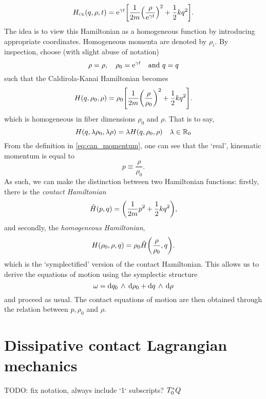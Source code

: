 \begin{equation}
    H_\text{\tiny{\textsc{CK}}}(q, \rho, t) = \mathrm{e}^{\gamma t}\qty[\frac{1}{2m}\qty(\frac{\rho}{\mathrm{e}^{\gamma t}})^2 + \frac{1}{2}kq^2].
\end{equation}
The idea is to view this Hamiltonian as a homogeneous function by introducing appropriate coordinates. Homogeneous momenta are denoted by $\rho_i$. By inspection, choose (with slight abuse of notation)
$$ \rho = \rho,\quad \rho_0 = \mathrm{e}^{\gamma t}\quad \text{and } q = q$$
such that the Caldirola-Kanai Hamiltonian becomes
\begin{equation}
    H(q, \rho_0, \rho) = \rho_0\qty[\frac{1}{2m}\qty(\frac{\rho}{\rho_0})^2 + \frac{1}{2}kq^2].
\end{equation}
which is homogeneous in fiber dimensions $\rho_0$ and $\rho$. That is to say,
$$ H(q, \lambda \rho_0, \lambda \rho) = \lambda H(q, \rho_0, \rho) \quad \lambda \in \mathbb{R}_0$$
From the definition in \cref{eq:can_momentum}, one can see that the `real', kinematic momentum is equal to
$$ p \equiv \frac{\rho}{\rho_0}. $$
As such, we can make the distinction between two Hamiltonian functions: firstly, there is the \emph{contact Hamiltonian}
$$ \hat{H}(p, q) = \qty(\frac{1}{2m}p^2 + \frac{1}{2}kq^2), $$
and secondly, the \emph{homogeneous Hamiltonian},
$$ H(\rho_0, \rho, q) = \rho_0 \hat{H}\qty(\frac{\rho}{\rho_0}, q).$$
which is the `symplectified' version of the contact Hamiltonian. This allows us to derive the equations of motion using the symplectic structure
$$ \omega =  \dd{q_0}\,\wedge\,\dd{\rho_0}  +  \dd{q}\,\wedge\,\dd{\rho} $$
and proceed as usual. The contact equations of motion are then obtained through the relation between $p, \rho_0$ and $\rho$.

\section{Dissipative contact Lagrangian mechanics}
TODO: fix notation, always include `1` subscripts?
$T^*_0Q$



%
